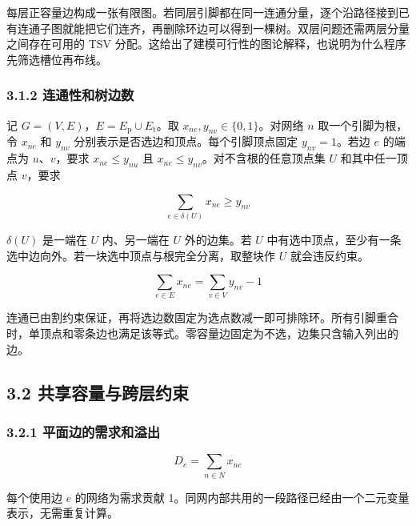 \documentclass[12pt,a4paper]{article}
\begin{document}
每层正容量边构成一张有限图。若同层引脚都在同一连通分量，逐个沿路径接到已有连通子图就能把它们连齐，再删除环边可以得到一棵树。双层问题还需两层分量之间存在可用的
TSV
分配。这给出了建模可行性的图论解释，也说明为什么程序先筛选槽位再布线。

\subsubsection{3.1.2
连通性和树边数}\label{ux8fdeux901aux6027ux548cux6811ux8fb9ux6570}

记 $G=(V,E)$，$E=E_{\mathrm p}\cup E_{\mathrm t}$。取 $x_{ne},y_{nv}\in\{0,1\}$。对网络 $n$ 取一个引脚为根，令 \(x_{ne}\) 和 \(y_{nv}\)
分别表示是否选边和顶点。每个引脚顶点固定 \(y_{nv}=1\)。若边 \(e\) 的端点为
\(u\)、\(v\)，要求 \(x_{ne}\le y_{nu}\) 且 \(x_{ne}\le y_{nv}\)。对不含根的任意顶点集 \(U\) 和其中任一顶点
\(v\)，要求

\begin{equation}
\sum_{e\in\delta(U)}x_{ne}\ge y_{nv}
\label{eq:cut}
\end{equation}

\(\delta(U)\) 是一端在 \(U\) 内、另一端在 \(U\) 外的边集。若 \(U\)
中有选中顶点，至少有一条选中边向外。若一块选中顶点与根完全分离，取整块作
\(U\) 就会违反约束。

\begin{equation}
\sum_{e\in E}x_{ne}=\sum_{v\in V}y_{nv}-1
\label{eq:tree}
\end{equation}

连通已由割约束保证，再将选边数固定为选点数减一即可排除环。所有引脚重合时，单顶点和零条边也满足该等式。零容量边固定为不选，边集只含输入列出的边。

\subsection{3.2
共享容量与跨层约束}\label{ux5171ux4eabux5bb9ux91cfux4e0eux8de8ux5c42ux7ea6ux675f}

\subsubsection{3.2.1
平面边的需求和溢出}\label{ux5e73ux9762ux8fb9ux7684ux9700ux6c42ux548cux6ea2ux51fa}

\begin{equation}
D_e=\sum_{n\in N}x_{ne}
\label{eq:demand}
\end{equation}

每个使用边 \(e\) 的网络为需求贡献
1。同网内部共用的一段路径已经由一个二元变量表示，无需重复计算。
\end{document}
